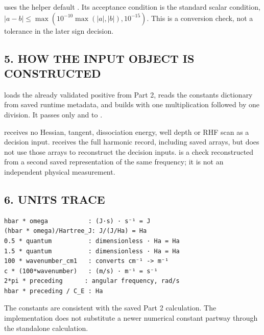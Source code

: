 \documentclass[10pt,a4paper]{article}
\begin{document}
 uses the helper default . Its acceptance condition is the standard scalar  condition, \(|a-b|\le\max(10^{-10}\max(|a|,|b|),10^{-15})\). This is a conversion check, not a tolerance in the later sign decision.

\subsection{5. HOW THE INPUT OBJECT IS CONSTRUCTED}
 loads the already validated positive  from Part 2, reads the constants dictionary from saved runtime metadata, and builds  with one multiplication followed by one division. It passes only  and  to .

 receives no Hessian, tangent, dissociation energy, well depth or RHF scan as a decision input.  receives the full harmonic record, including saved arrays, but does not use those arrays to reconstruct the decision inputs.  is a check reconstructed from a second saved representation of the same frequency; it is not an independent physical measurement.

\subsection{6. UNITS TRACE}
\begin{Verbatim}
hbar * omega           : (J·s) · s⁻¹ = J
(hbar * omega)/Hartree_J: J/(J/Ha) = Ha
0.5 * quantum          : dimensionless · Ha = Ha
1.5 * quantum          : dimensionless · Ha = Ha
100 * wavenumber_cm1   : converts cm⁻¹ -> m⁻¹
c * (100*wavenumber)   : (m/s) · m⁻¹ = s⁻¹
2*pi * preceding      : angular frequency, rad/s
hbar * preceding / C_E : Ha
\end{Verbatim}
The constants are consistent with the saved Part 2 calculation. The implementation does not substitute a newer numerical constant partway through the standalone calculation.
\end{document}
